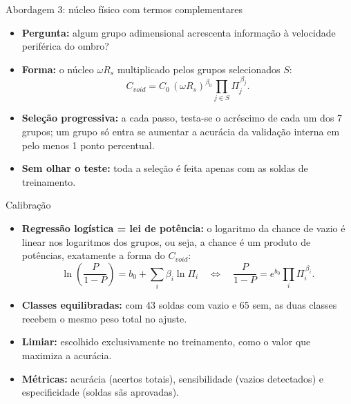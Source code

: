 \documentclass[aspectratio=169,11pt]{beamer}
\newenvironment{bullets}{\begin{itemize}\setlength{\itemsep}{5pt}}{\end{itemize}}
\begin{document}
\begin{frame}{Abordagem 3: núcleo físico com termos complementares}
\vspace{0.2cm}
\begin{bullets}
  \item \textbf{Pergunta:} algum grupo adimensional acrescenta informação à velocidade periférica do ombro?
  \item \textbf{Forma:} o núcleo $\omega R_s$ multiplicado pelos grupos selecionados $S$:
  \[ C_{void} = C_0\,(\omega R_s)^{\beta_0} \prod_{j \in S} \Pi_{j}^{\,\beta_j}. \]
  \item \textbf{Seleção progressiva:} a cada passo, testa-se o acréscimo de cada um dos 7 grupos; um grupo só entra se aumentar a acurácia da validação interna em pelo menos 1 ponto percentual.
  \item \textbf{Sem olhar o teste:} toda a seleção é feita apenas com as soldas de treinamento.
\end{bullets}
\end{frame}

\begin{frame}{Calibração}
\begin{bullets}
  \item \textbf{Regressão logística = lei de potência:} o logaritmo da chance de vazio é linear nos logaritmos dos grupos, ou seja, a chance é um produto de potências, exatamente a forma do $C_{void}$:
  \[ \ln\!\left(\frac{P}{1-P}\right) = b_0 + \sum_i \beta_i \ln \Pi_i \quad \Longleftrightarrow \quad \frac{P}{1-P} = e^{b_0}\prod_i \Pi_{i}^{\,\beta_i}. \]
  \item \textbf{Classes equilibradas:} com 43 soldas com vazio e 65 sem, as duas classes recebem o mesmo peso total no ajuste.
  \item \textbf{Limiar:} escolhido exclusivamente no treinamento, como o valor que maximiza a acurácia.
  \item \textbf{Métricas:} acurácia (acertos totais), sensibilidade (vazios detectados) e especificidade (soldas sãs aprovadas).
\end{bullets}
\end{frame}
\end{document}
